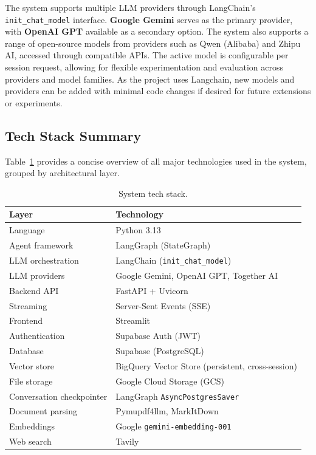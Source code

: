 The system supports multiple LLM providers through LangChain's \texttt{init\_chat\_model} interface. 
\textbf{Google Gemini} serves as the primary provider, with \textbf{OpenAI GPT} available as a secondary option. 
The system also supports a range of open-source models from providers such as Qwen (Alibaba) and Zhipu AI, accessed through compatible APIs. 
The active model is configurable per session request, allowing for flexible experimentation and evaluation across providers and model families. 
As the project uses Langchain, new models and providers can be added with minimal code changes if desired for future extensions or experiments.

\subsection{Tech Stack Summary}

Table~\ref{tab:tech-stack} provides a concise overview of all major technologies used in the system, grouped by architectural layer.

\begin{table}[h]
\centering
\begin{tabular}{ll}
\hline
\textbf{Layer} & \textbf{Technology} \\
\hline
Language & Python 3.13 \\
Agent framework & LangGraph (StateGraph) \\
LLM orchestration & LangChain (\texttt{init\_chat\_model}) \\
LLM providers & Google Gemini, OpenAI GPT, Together AI \\
Backend API & FastAPI + Uvicorn \\
Streaming & Server-Sent Events (SSE) \\
Frontend & Streamlit \\
Authentication & Supabase Auth (JWT) \\
Database & Supabase (PostgreSQL) \\
Vector store & BigQuery Vector Store (persistent, cross-session) \\
File storage & Google Cloud Storage (GCS) \\
Conversation checkpointer & LangGraph \texttt{AsyncPostgresSaver} \\
Document parsing & Pymupdf4llm, MarkItDown \\
Embeddings & Google \texttt{gemini-embedding-001} \\
Web search & Tavily \\
\hline
\end{tabular}
\caption{System tech stack.}
\label{tab:tech-stack}
\end{table}

